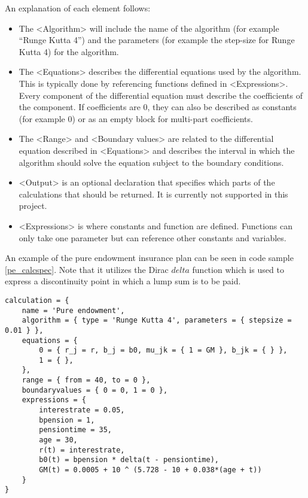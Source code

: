 An explanation of each element follows:
\begin{itemize}
\item The \textless Algorithm\textgreater{} will include the name of the algorithm (for example ``Runge Kutta 4'') and the parameters (for example the step-size for Runge Kutta 4) for the algorithm.
\item The \textless Equations\textgreater{}  describes the differential equations used by the algorithm. This is typically done by referencing functions defined in \textless{}Expressions\textgreater{}. Every component of the differential equation must describe the coefficients of the component. If coefficients are 0, they can also be described as constants (for example 0) or as an empty block for multi-part coefficients.
\item The \textless{}Range\textgreater{} and \textless{}Boundary values\textgreater{} are related to the differential equation described in \textless{}Equations\textgreater{} and describes the interval in which the algorithm should solve the equation subject to the boundary conditions.
\item \textless{}Output\textgreater{} is an optional declaration that specifies which parts of the calculations that should be returned. It is currently not supported in this project. %
\item \textless{}Expressions\textgreater{} is where constants and function are defined. Functions can only take one parameter but can reference other constants and variables.
\end{itemize}

An example of the pure endowment insurance plan can be seen in code sample \ref{pe_calcspec}. 
Note that it utilizes the Dirac $delta$ function\cite{hassani2009dirac} which is used to express a discontinuity point in which a lump sum is to be paid.%


\begin{lstlisting}[caption=The pure endowment insurance plan expressed in CalcSpec, label=pe_calcspec, language=calcspec]
calculation = {
	name = 'Pure endowment',
	algorithm = { type = 'Runge Kutta 4', parameters = { stepsize = 0.01 } },
	equations = { 
		0 = { r_j = r, b_j = b0, mu_jk = { 1 = GM }, b_jk = { } },
		1 = { },
	},
	range = { from = 40, to = 0 },
	boundaryvalues = { 0 = 0, 1 = 0 },
	expressions = {
		interestrate = 0.05,
		bpension = 1,
		pensiontime = 35,
		age = 30,
		r(t) = interestrate,
		b0(t) = bpension * delta(t - pensiontime),
		GM(t) = 0.0005 + 10 ^ (5.728 - 10 + 0.038*(age + t))
	}
}
\end{lstlisting}


